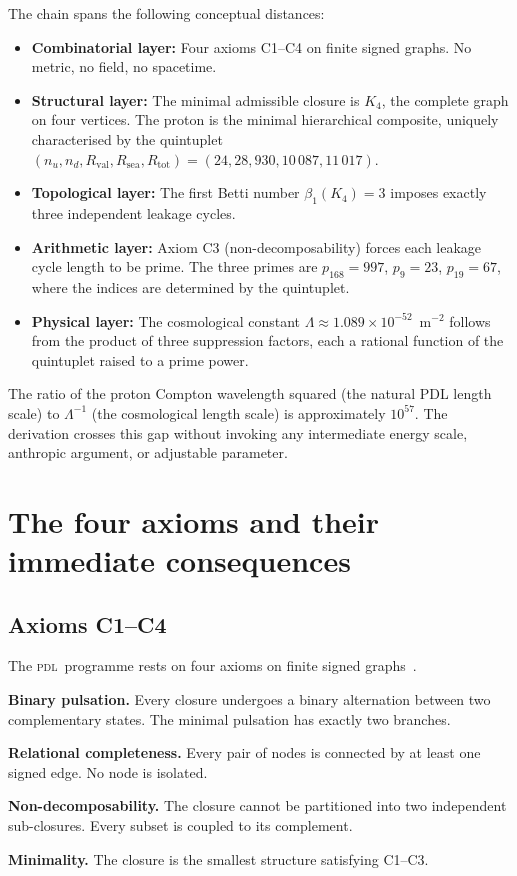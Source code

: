 \documentclass[12pt,a4paper]{article}
\theoremstyle{plain}
\theoremstyle{definition}
\theoremstyle{remark}
\newcommand{\Kfour}{K_4}
\newcommand{\PDL}{\textsc{pdl}}
\newcommand{\Rtot}{R_{\mathrm{tot}}}
\newcommand{\Rval}{R_{\mathrm{val}}}
\newcommand{\Rsea}{R_{\mathrm{sea}}}
\begin{document}
The chain spans the following conceptual distances:
\begin{itemize}
\item \textbf{Combinatorial layer:} Four axioms C1--C4 on finite signed graphs. No metric, no field, no spacetime.
\item \textbf{Structural layer:} The minimal admissible closure is $\Kfour$, the complete graph on four vertices. The proton is the minimal hierarchical composite, uniquely characterised by the quintuplet $(n_u, n_d, \Rval, \Rsea, \Rtot) = (24, 28, 930, 10\,087, 11\,017)$.
\item \textbf{Topological layer:} The first Betti number $\beta_1(\Kfour) = 3$ imposes exactly three independent leakage cycles.
\item \textbf{Arithmetic layer:} Axiom C3 (non-decomposability) forces each leakage cycle length to be prime. The three primes are $p_{168} = 997$, $p_9 = 23$, $p_{19} = 67$, where the indices are determined by the quintuplet.
\item \textbf{Physical layer:} The cosmological constant $\Lambda \approx 1.089 \times 10^{-52}$~m$^{-2}$ follows from the product of three suppression factors, each a rational function of the quintuplet raised to a prime power.
\end{itemize}

The ratio of the proton Compton wavelength squared (the natural PDL length scale) to $\Lambda^{-1}$ (the cosmological length scale) is approximately $10^{57}$. The derivation crosses this gap without invoking any intermediate energy scale, anthropic argument, or adjustable parameter.

\section{The four axioms and their immediate consequences}
\label{sec:axioms}

\subsection{Axioms C1--C4}
\label{subsec:axioms}

The \PDL\ programme rests on four axioms on finite signed graphs~\cite{PDL_D01_2026}.

\begin{description}[leftmargin=1.5cm]
\item[C1] \textbf{Binary pulsation.} Every closure undergoes a binary alternation between two complementary states. The minimal pulsation has exactly two branches.
\item[C2] \textbf{Relational completeness.} Every pair of nodes is connected by at least one signed edge. No node is isolated.
\item[C3] \textbf{Non-decomposability.} The closure cannot be partitioned into two independent sub-closures. Every subset is coupled to its complement.
\item[C4] \textbf{Minimality.} The closure is the smallest structure satisfying C1--C3.
\end{description}
\end{document}
